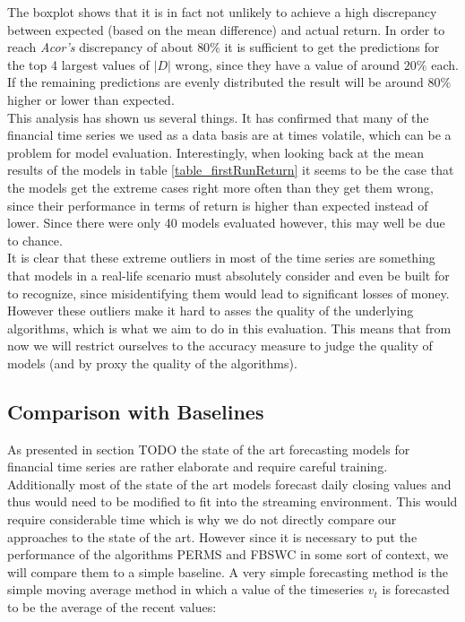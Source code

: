 The boxplot shows that it is in fact not unlikely to achieve a high discrepancy between expected (based on the mean difference) and actual return. In order to reach \textit{Acor's} discrepancy of about $80\%$ it is sufficient to get the predictions for the top 4 largest values of $|D|$ wrong, since they have a value of around $20\%$ each. If the remaining predictions are evenly distributed the result will be around $80\%$ higher or lower than expected. \\
This analysis has shown us several things. It has confirmed that many of the financial time series we used as a data basis are at times volatile, which can be a problem for model evaluation. Interestingly, when looking back at the mean results of the models in table \ref{table_firstRunReturn} it seems to be the case that the models get the extreme cases right more often than they get them wrong, since their performance in terms of return is higher than expected instead of lower. Since there were only 40 models evaluated however, this may well be due to chance. \\
It is clear that these extreme outliers in most of the time series are something that models in a real-life scenario must absolutely consider and even be built for to recognize, since misidentifying them would lead to significant losses of money. However these outliers make it hard to asses the quality of the underlying algorithms, which is what we aim to do in this evaluation. This means that from now we will restrict ourselves to the accuracy measure to judge the quality of models (and by proxy the quality of the algorithms).

\subsection{Comparison with Baselines}
As presented in section TODO the state of the art forecasting models for financial time series are rather elaborate and require careful training. Additionally most of the state of the art models forecast daily closing values and thus would need to be modified to fit into the streaming environment. This would require considerable time which is why we do not directly compare our approaches to the state of the art. However since it is necessary to put the performance of the algorithms PERMS and FBSWC in some sort of context, we will compare them to a simple baseline. A very simple forecasting method is the simple moving average method \cite{makridakis1982accuracy} in which a value of the timeseries $v_t$ is forecasted to be the average of the recent values:

